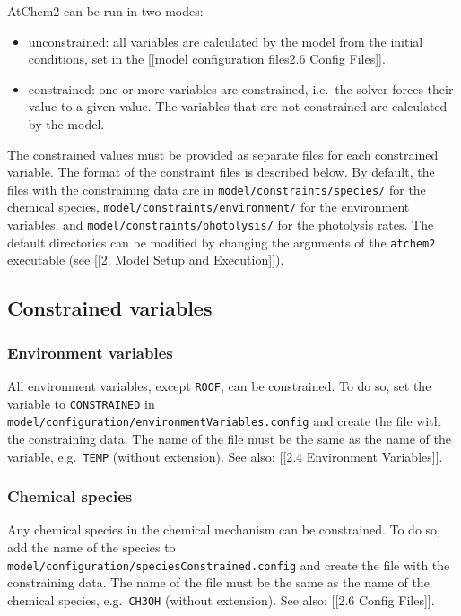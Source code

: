 AtChem2 can be run in two modes:

\begin{itemize}
\tightlist
\item
  unconstrained: all variables are calculated by the model from the
  initial conditions, set in the {[}{[}model configuration
  files\textbar{}2.6 Config Files{]}{]}.
\item
  constrained: one or more variables are constrained, i.e.~the solver
  forces their value to a given value. The variables that are not
  constrained are calculated by the model.
\end{itemize}

The constrained values must be provided as separate files for each
constrained variable. The format of the constraint files is described
below. By default, the files with the constraining data are in
\texttt{model/constraints/species/} for the chemical species,
\texttt{model/constraints/environment/} for the environment variables,
and \texttt{model/constraints/photolysis/} for the photolysis rates. The
default directories can be modified by changing the arguments of the
\texttt{atchem2} executable (see {[}{[}2. Model Setup and
Execution{]}{]}).

\hypertarget{constrained-variables}{%
\subsection{Constrained variables}\label{constrained-variables}}

\hypertarget{environment-variables}{%
\subsubsection{Environment variables}\label{environment-variables}}

All environment variables, except \texttt{ROOF}, can be constrained. To
do so, set the variable to \texttt{CONSTRAINED} in
\texttt{model/configuration/environmentVariables.config} and create the
file with the constraining data. The name of the file must be the same
as the name of the variable, e.g.~\texttt{TEMP} (without extension). See
also: {[}{[}2.4 Environment Variables{]}{]}.

\hypertarget{chemical-species}{%
\subsubsection{Chemical species}\label{chemical-species}}

Any chemical species in the chemical mechanism can be constrained. To do
so, add the name of the species to
\texttt{model/configuration/speciesConstrained.config} and create the
file with the constraining data. The name of the file must be the same
as the name of the chemical species, e.g.~\texttt{CH3OH} (without
extension). See also: {[}{[}2.6 Config Files{]}{]}.

